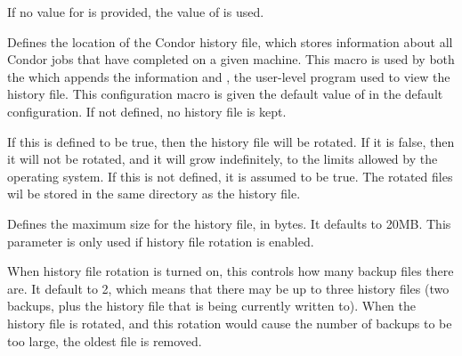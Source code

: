 \begin{description}
  If no value for  is provided, the value of 
  is used.


\item[\Macro{HISTORY}] \label{param:History} Defines the
  location of the Condor history file, which stores information about
  all Condor jobs that have completed on a given machine.  This macro
  is used by both the  which appends the information
  and , the user-level program used to view
  the history file.
  This configuration macro is given the default value of
   in the default configuration.
  If not defined,
  no history file is kept.

\item[\Macro{ENABLE\_HISTORY\_ROTATION}] \label{param:EnableHistoryRotation} 
  If this is defined to be true, then the
  history file will be rotated. If it is false, then it will not be
  rotated, and it will grow indefinitely, to the limits allowed by the
  operating system. If this is not defined, it is assumed to be
  true. The rotated files wil be stored in the same directory as the
  history file. 

\item[\Macro{MAX\_HISTORY\_LOG}] \label{param:MaxHistoryLog}
  Defines the maximum size for the history file, in bytes. It defaults
  to 20MB. This parameter is only used if history file rotation is
  enabled. 

\item[\Macro{MAX\_HISTORY\_ROTATIONS}] \label{param:MaxHistoryRotations}
  When history file rotation is turned on, this controls how many
  backup files there are. It default to 2, which means that there may
  be up to three history files (two backups, plus the history file
  that is being currently written to). When the history file is
  rotated, and this rotation would cause the number of backups to be
  too large, the oldest file is removed. 


\end{description}
